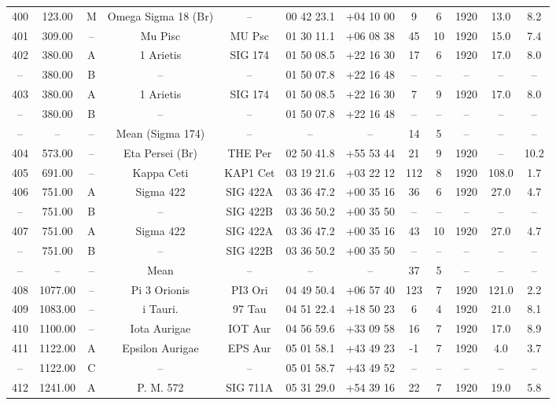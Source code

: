 \begin{table}
\begin{tabular}{cccccccccccc}
400 & 123.00 & M & Omega Sigma 18 (Br) & -- & 00 42 23.1 & +04 10 00 & 9 & 6 & 1920 & 13.0 & 8.2 \\
401 & 309.00 & -- & Mu Pisc & MU Psc & 01 30 11.1 & +06 08 38 & 45 & 10 & 1920 & 15.0 & 7.4 \\
402 & 380.00 & A & 1 Arietis & SIG 174 & 01 50 08.5 & +22 16 30 & 17 & 6 & 1920 & 17.0 & 8.0 \\
-- & 380.00 & B & -- & -- & 01 50 07.8 & +22 16 48 & -- & -- & -- & -- & -- \\
403 & 380.00 & A & 1 Arietis & SIG 174 & 01 50 08.5 & +22 16 30 & 7 & 9 & 1920 & 17.0 & 8.0 \\
-- & 380.00 & B & -- & -- & 01 50 07.8 & +22 16 48 & -- & -- & -- & -- & -- \\
-- & -- & -- & Mean (Sigma 174) & -- & -- & -- & 14 & 5 & -- & -- & -- \\
404 & 573.00 & -- & Eta Persei (Br) & THE Per & 02 50 41.8 & +55 53 44 & 21 & 9 & 1920 & -- & 10.2 \\
405 & 691.00 & -- & Kappa Ceti & KAP1 Cet & 03 19 21.6 & +03 22 12 & 112 & 8 & 1920 & 108.0 & 1.7 \\
406 & 751.00 & A & Sigma 422 & SIG 422A & 03 36 47.2 & +00 35 16 & 36 & 6 & 1920 & 27.0 & 4.7 \\
-- & 751.00 & B & -- & SIG 422B & 03 36 50.2 & +00 35 50 & -- & -- & -- & -- & -- \\
407 & 751.00 & A & Sigma 422 & SIG 422A & 03 36 47.2 & +00 35 16 & 43 & 10 & 1920 & 27.0 & 4.7 \\
-- & 751.00 & B & -- & SIG 422B & 03 36 50.2 & +00 35 50 & -- & -- & -- & -- & -- \\
-- & -- & -- & Mean & -- & -- & -- & 37 & 5 & -- & -- & -- \\
408 & 1077.00 & -- & Pi 3 Orionis & PI3 Ori & 04 49 50.4 & +06 57 40 & 123 & 7 & 1920 & 121.0 & 2.2 \\
409 & 1083.00 & -- & i Tauri. & 97 Tau & 04 51 22.4 & +18 50 23 & 6 & 4 & 1920 & 21.0 & 8.1 \\
410 & 1100.00 & -- & Iota Aurigae & IOT Aur & 04 56 59.6 & +33 09 58 & 16 & 7 & 1920 & 17.0 & 8.9 \\
411 & 1122.00 & A & Epsilon Aurigae & EPS Aur & 05 01 58.1 & +43 49 23 & -1 & 7 & 1920 & 4.0 & 3.7 \\
-- & 1122.00 & C & -- & -- & 05 01 58.7 & +43 49 52 & -- & -- & -- & -- & -- \\
412 & 1241.00 & A & P. M. 572 & SIG 711A & 05 31 29.0 & +54 39 16 & 22 & 7 & 1920 & 19.0 & 5.8 \\

\end{tabular}
\end{table}
